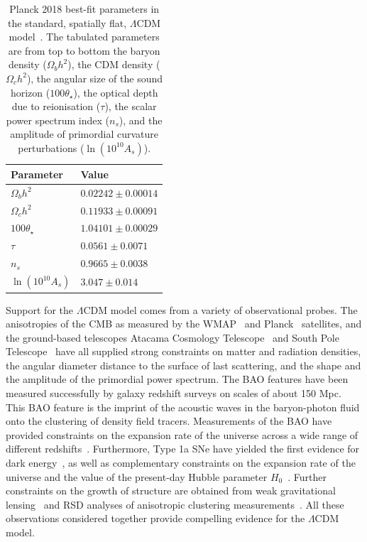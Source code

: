 \begin{table}[ht]
	\centering
\begin{tabular}{ l | l}
	\textbf{Parameter} & \textbf{Value} \\
	\hline
	$\Omega_b h^2$ & $0.02242 \pm 0.00014$ \\
	$\Omega_c h^2$  & $0.11933 \pm 0.00091$ \\
	$100 \theta_\star$ & $1.04101 \pm 0.00029$ \\
	$\tau$  & $0.0561 \pm 0.0071$ \\
	$n_s$  & $0.9665 \pm 0.0038$ \\
	$\ln (10^{10} A_s)$  & $3.047 \pm 0.014$
\end{tabular}
	\caption{Planck 2018 best-fit parameters in the standard, spatially flat, $\Lambda$CDM model~\cite{Aghanim:2018eyx}. The tabulated parameters are from top to bottom the baryon density ($\Omega_b h^2$), the CDM density ($\Omega_c h^2$), the angular size of the sound horizon ($100 \theta_\star$), the optical depth due to reionisation ($\tau$), the scalar power spectrum index ($n_s$), and the amplitude of primordial curvature perturbations ($\ln (10^{10} A_s)$).} \label{tab:planck2018params}
\end{table}

Support for the $\Lambda$CDM model comes from a variety of observational probes. The anisotropies of the CMB as measured by the WMAP~\cite{Bennett:2013} and Planck~\cite{Aghanim:2018eyx} satellites, and the ground-based telescopes Atacama Cosmology Telescope~\cite{Das:2013zf} and South Pole Telescope~\cite{George:2014oba} have all supplied strong constraints on matter and radiation densities, the angular diameter distance to the surface of last scattering, and the shape and the amplitude of the primordial power spectrum. The BAO features have been measured successfully by galaxy redshift surveys on scales of about 150 Mpc. This BAO feature is the imprint of the acoustic waves in the baryon-photon fluid onto the clustering of density field tracers. Measurements of the BAO have provided constraints on the expansion rate of the universe across a wide range of different redshifts~\cite{BOSS:2016wmc,Ross:2014qpa,Oka:2013cba,Sanchez:2006,Beutler:2011,Kazin:2014qga}. Furthermore, Type 1a SNe have yielded the first evidence for dark energy~\cite{SupernovaSearchTeam:1998fmf,SupernovaCosmologyProject:1998vns}, as well as complementary constraints on the expansion rate of the universe and the value of the present-day Hubble parameter $H_0$~\cite{Freedman:2012,Riess:2016jrr,Suzuki:2012,SDSS:2014iwm}. Further constraints on the growth of structure are obtained from weak gravitational lensing~\cite{DES:2017qwj,Heymans:2013fya} and RSD analyses of anisotropic clustering measurements~\cite{BOSS:2016psr,BOSS:2016teh}. All these observations considered together provide compelling evidence for the $\Lambda$CDM model.


